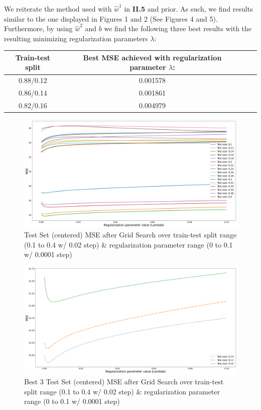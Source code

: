 \documentclass{homework}
\begin{document}
We reiterate the method used with $\hat{w}^1$ in \textbf{II.5} and prior. As such, we find results similar to the one
displayed in Figures 1 and 2 (See Figures 4 and 5). Furthermore, by using $\hat{w}^2$ and $b$ we find the following 
three best results with the resulting minimizing regularization parameters $\lambda$:

\begin{center}
\begin{tabular}{ | c | c | c | c | } 
\hline
\textbf{Train-test split} & \textbf{Best MSE achieved with regularization parameter $\lambda$:} \\
\hline
0.88/0.12 & 0.001578 \\
\hline
0.86/0.14 & 0.001861 \\
\hline
0.82/0.16 & 0.004979 \\
\hline
\end{tabular}
\end{center}

\begin{figure}[H]
\begin{center}
\includegraphics[width=\textwidth]{images/grid_search_w2.png}
\end{center}
\caption{Test Set (centered) MSE after Grid Search over train-test split range (0.1 to 0.4 w/ 0.02 step) \& regularization parameter range (0 to 0.1 w/ 0.0001 step)}
\end{figure}

\begin{figure}[H]
\begin{center}
\includegraphics[width=\textwidth]{images/grid_search_w2_best3.png}
\end{center}
\caption{Best 3 Test Set (centered) MSE after Grid Search over train-test split range (0.1 to 0.4 w/ 0.02 step) \& regularization parameter range (0 to 0.1 w/ 0.0001 step)}
\end{figure}
\end{document}

